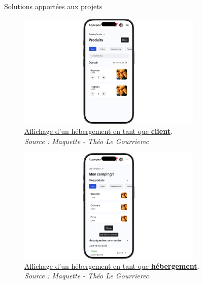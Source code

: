 \documentclass{beamer}
\begin{document}
\begin{frame}{Solutions apportées aux projets}
\begin{center}
		 {
			\addtocounter{figure}{1}
			\begin{figure}[t]
  				\includegraphics[height=5.5cm]{../img/maquette/controlle_acces_client.png}
				\caption{	
					\centering			
  					\href{https://github.com/Matteo-K/Soutenance_E-delic/blob/main/img/maquette/controlle_acces_client.png}{\underline{Affichage d'un hébergement en tant que \textbf{client}}}.\\
  					\textit{Source : Maquette - Théo Le Gourrierec}
				}
  				\label{fig:controlle_acces_client}
  			\end{figure}
		}
		
		\only<7> {
			\addtocounter{figure}{2}
			\begin{figure}[t]
  				\includegraphics[height=5.5cm]{../img/maquette/controlle_acces_hebergement.png}
				\caption{	
					\centering			
  					\href{https://github.com/Matteo-K/Soutenance_E-delic/blob/main/img/maquette/controlle_acces_hebergement.png}{\underline{Affichage d'un hébergement en tant que \textbf{hébergement}}}.\\
  					\textit{Source : Maquette - Théo Le Gourrierec}
				}
  				\label{fig:controlle_acces_hebergement}
  			\end{figure}
		}
		

\end{center}
\end{frame}
\end{document}
